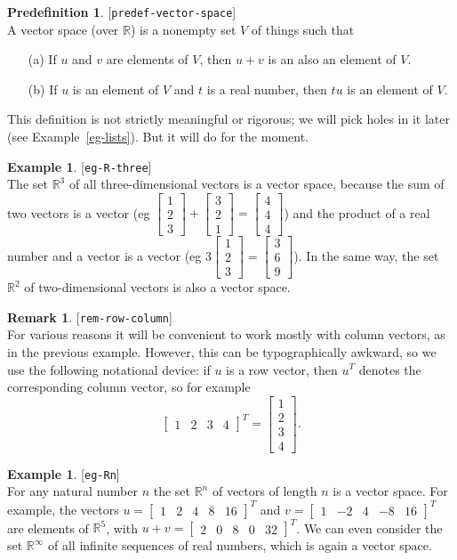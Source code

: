 \documentclass{amsart}
\newcommand{\lbl}[1]{\label{#1}\textup{[\texttt{#1}]}\ \\}
\newcommand{\lbl}{\label}
\newcommand{\R}         {{\mathbb{R}}}
\newcommand{\bsm}       {\left[\begin{smallmatrix}}
\newcommand{\esm}       {\end{smallmatrix}\right]}
\renewcommand{\:}       {\colon}
\theoremstyle{definition}
\newtheorem{remark}[theorem]{Remark}
\newtheorem{predefinition}[theorem]{Predefinition}
\newtheorem{example}[theorem]{Example}
\begin{document}
\begin{predefinition}\lbl{predef-vector-space}
 A vector space (over $\R$) is a nonempty set $V$ of things
 such that
 \begin{itemize}
  \item[(a)] If $u$ and $v$ are elements of $V$, then $u+v$
   is an also an element of $V$.
  \item[(b)] If $u$ is an element of $V$ and $t$ is a real
   number, then $tu$ is an element of $V$.
 \end{itemize}
\end{predefinition}

This definition is not strictly meaningful or rigorous; we
will pick holes in it later (see Example~\ref{eg-lists}).  But
it will do for the moment.

\begin{example}\lbl{eg-R-three}
 The set $\R^3$ of all three-dimensional vectors is a vector
 space, because the sum of two vectors is a vector (eg
 $\bsm 1\\2\\3 \esm+\bsm 3\\2\\1\esm=\bsm 4\\4\\4\esm$) and
 the product of a real number and a vector is a vector (eg
 $3\bsm 1\\2\\3\esm=\bsm 3\\6\\9\esm$).  In the same way,
 the set $\R^2$ of two-dimensional vectors is also a vector
 space.
\end{example}

\begin{remark}\lbl{rem-row-column}
 For various reasons it will be convenient to work mostly
 with column vectors, as in the previous example.  However,
 this can be typographically awkward, so we use the
 following notational device: if $u$ is a row vector, then
 $u^T$ denotes the corresponding column vector, so for
 example
 \[ \bsm 1 & 2 & 3 & 4 \esm ^T = 
    \bsm 1 \\ 2 \\ 3 \\ 4 \esm.
 \]
\end{remark}

\begin{example}\lbl{eg-Rn}
 For any natural number $n$ the set $\R^n$ of vectors of
 length $n$ is a vector space.  For example, the vectors
 $u=\bsm 1&2&4&8&16\esm^T$ and $v=\bsm 1&-2&4&-8&16\esm^T$
 are elements of $\R^5$, with $u+v=\bsm 2&0&8&0&32\esm^T$.
 We can even consider the set $\R^\infty$ of all infinite
 sequences of real numbers, which is again a vector space.
\end{example}
\end{document}
